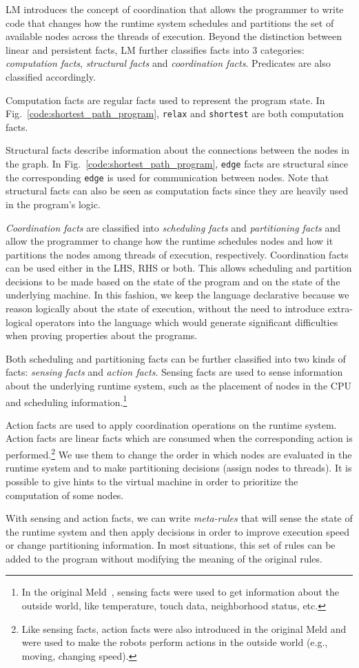 LM introduces the concept of coordination that allows the programmer to write
code that changes how the runtime system schedules and partitions the set of
available nodes across the threads of execution. Beyond the distinction between
linear and persistent facts, LM further classifies facts into 3 categories:
\emph{computation facts}, \emph{structural facts} and \emph{coordination facts}.
Predicates are also classified accordingly.

Computation facts are regular facts used to represent the program state. In
Fig.~\ref{code:shortest_path_program}, \texttt{relax} and \texttt{shortest} are
both computation facts.

Structural facts describe information about the connections between the nodes in
the graph. In Fig.~\ref{code:shortest_path_program}, \texttt{edge} facts are
structural since the corresponding \texttt{edge} is used for communication
between nodes.  Note that structural facts can also be seen as computation facts
since they are heavily used in the program's logic.

\emph{Coordination facts} are classified into \emph{scheduling facts} and
\emph{partitioning facts} and allow the programmer to change how the runtime
schedules nodes and how it partitions the nodes among threads of execution,
respectively. Coordination facts can be used either in the LHS, RHS or both.
This allows scheduling and partition decisions to be made based on the state of
the program and on the state of the underlying machine.  In this fashion, we
keep the language declarative because we reason logically about the state of
execution, without the need to introduce extra-logical operators into the
language which would generate significant difficulties when proving properties about
the programs.

Both scheduling and partitioning facts can be further classified into two kinds
of facts: \emph{sensing facts} and \emph{action facts}. Sensing facts are used
to sense information about the underlying runtime system, such as the placement
of nodes in the CPU and scheduling information.\footnote{In the original
   Meld~\cite{ashley-rollman-iclp09}, sensing facts were used to get information
about the outside world, like temperature, touch data, neighborhood status,
etc.}

Action facts are used to apply coordination operations on the runtime system.
Action facts are linear facts which are consumed when the corresponding action
is performed.\footnote{Like sensing facts, action facts were also introduced in the
original Meld and were used to make the robots perform actions in the outside
world (e.g., moving, changing speed).} We use them to change the order in
which nodes are evaluated in the runtime system and to make partitioning
decisions (assign nodes to threads). It is possible to give hints to the virtual
machine in order to prioritize the computation of some nodes.

With sensing and action facts, we can write \emph{meta-rules} that will
sense the state of the runtime system and then apply decisions in order to
improve execution speed or change partitioning information. In most situations,
this set of rules can be added to the program without modifying the meaning of
the original rules.
